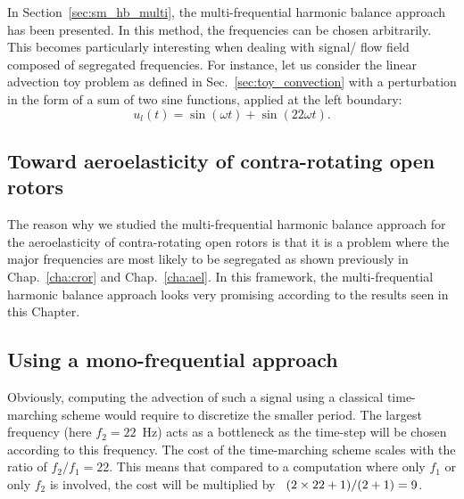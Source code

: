 

In Section~\ref{sec:sm_hb_multi}, the multi-frequential harmonic
balance approach has been presented. In this method,
the frequencies can be chosen arbitrarily. This becomes particularly
interesting when dealing with signal/ flow field composed of segregated
frequencies. For instance, let us consider the linear advection toy problem
as defined in Sec.~\ref{sec:toy_convection} with 
a perturbation 
in the form of a sum of two sine functions,
applied at the left boundary:
\begin{equation}
    u_l(t) = \sin(\omega t) + \sin(22 \omega t).
    \label{eq:multifreq_inj_func}
\end{equation}

\subsection{Toward aeroelasticity of contra-rotating open rotors}
The reason why we studied the multi-frequential harmonic balance
approach for the aeroelasticity of contra-rotating open rotors
is that it is a problem where the major frequencies are most
likely to be segregated as shown previously in Chap.~\ref{cha:cror} and
Chap.~\ref{cha:ael}. In this framework, the multi-frequential
harmonic balance approach looks very promising according to the results
seen in this Chapter.

\subsection{Using a mono-frequential approach}

Obviously, computing the advection of such a signal using
a classical time-marching scheme would require to discretize the
smaller period. The largest frequency
(here $f_2 = 22$~Hz) acts as a bottleneck as the time-step will be chosen
according to this frequency. The cost of the time-marching
scheme scales with the ratio of $f_2 / f_1 = 22$. This
means that compared to a computation where only $f_1$ or only $f_2$
is involved, the cost will be multiplied by~ \mbox{$(2 \times 22 + 1) / (2 \time 1+1) = 9$}.

